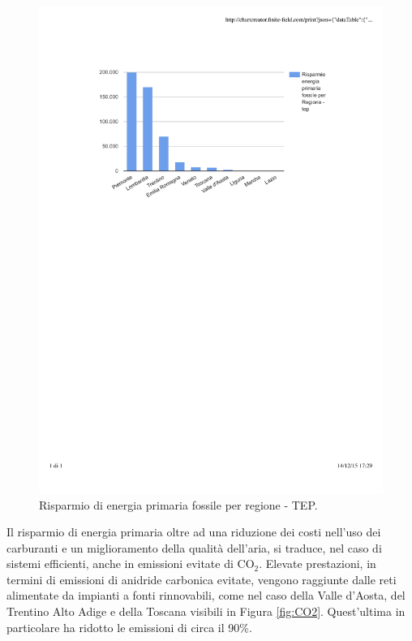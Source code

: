 \documentclass[laurea,oneside,11pt]{USiena_tesiLM3}
\begin{document}
\begin{figure}[!ht]
\centering
\includegraphics[width=\textwidth]{figure/tep} 
\caption{Risparmio di energia primaria fossile per regione - TEP.}
\label{fig:tep}
\end{figure}

Il risparmio di energia primaria oltre ad una riduzione dei costi nell'uso dei carburanti e un miglioramento della qualità dell'aria, si traduce, nel caso di sistemi efficienti, anche in emissioni evitate di CO$_2$.
Elevate prestazioni, in termini di emissioni di anidride carbonica evitate, vengono raggiunte dalle reti alimentate da impianti a fonti rinnovabili, come nel caso della Valle d'Aosta, del Trentino Alto Adige e della Toscana visibili in Figura \ref{fig:CO2}. Quest'ultima in particolare ha ridotto le emissioni di circa il 90\%.
\end{document}
